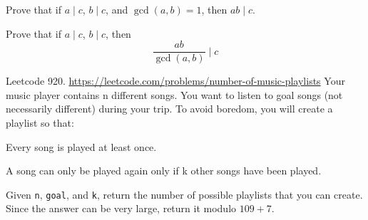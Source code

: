 \begin{ex}
  Prove that if $a \mid c$, $b \mid c$, and $\gcd(a,b) = 1$, then
  $ab \mid c$.
\end{ex}

\begin{ex}
  Prove that if $a \mid c$, $b \mid c$, then
  \[
  \frac{ab}{\gcd(a,b)} \mid c
  \]
\end{ex}


\begin{ex}
  Leetcode 920.
  \url{https://leetcode.com/problems/number-of-music-playlists}
  Your music player contains n different songs. You want to listen to goal songs (not necessarily different) during your trip. To avoid boredom, you will create a playlist so that:

Every song is played at least once.

A song can only be played again only if k other songs have been played.

Given \verb!n!, \verb!goal!, and \verb!k!, return the number of possible playlists that you can create. Since the answer can be very large, return it modulo $109 + 7$.
\end{ex}
